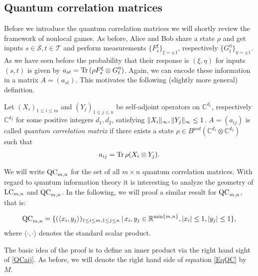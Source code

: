 \subsection{Quantum correlation matrices}
Before we introduce the quantum correlation matrices we will shortly review the framework of nonlocal games. As before, Alice and Bob share a state $ \rho $ and get inputs $ s \in \mathcal{S}, t \in \mathcal{T} $ and perform measurements $ \{ F_s^{\xi} \}_{\xi = \pm 1} $, respectively $ \{ G_t^{\eta} \}_{\eta = \pm 1} $.
As we have seen before the probability that their response is $ (\xi,\eta) $ for inputs $ (s,t) $ is given by 
$ a_{st} = \textup{Tr} \, {(\rho F_s^\xi \otimes G_t^\eta )}  $. Again, we can encode these information in a matrix $ A=(a_{st}) $. This motivates the following (slightly more general) definition. 
\begin{dfn}
	Let $ (X_i)_{1 \le i \le m } $ and $ (Y_j)_{1 \le j \le n} $ be self-adjoint operators on $ \mathbb{C}^{d_1} $, respectively $ \mathbb{C}^{d_2} $ for some positive integers $ d_1,d_2 $, satisfying $  \Vert {X_i} \Vert_{\infty},  \Vert {Y_j} \Vert_{\infty} \le 1 $. $ A = (a_{ij}) $ is called {\itshape quantum correlation matrix} if there exists a state $ \rho \in B^{psd}(\mathbb{C}^{d_1} \otimes \mathbb{C}^{d_2})$ such that 
	\begin{align}\label{QCaij}
	a_{ij} = \textup{Tr} \, {\rho (X_i \otimes Y_j)} .
	\end{align}
\end{dfn}
\noindent We will write $ \textup{QC}_{m,n} $ for the set of all $ m \times n $ quantum correlation matrices.
With regard to quantum information theory it is interesting to analyze the geometry of $ \textup{LC}_{m,n} $ and $ \textup{QC}_{m,n} $. In the following, we will proof a similar result for $ \textup{QC}_{m,n} $, that is: 
\begin{lemma}\label{LemQC}
	\begin{align}\label{EqQC}
		\textup{QC}_{m,n} = \{ (\langle x_i,y_j \rangle)_{1 \le i \le m, 1 \le j \le n} \,| \, x_i,y_j \in \mathbb{R}^{ \min \{m,n \} }, \vert x_i  \vert \le 1, \vert y_j \vert \le 1  \},
	\end{align}
	where $ \langle \cdot , \cdot \rangle $ denotes the standard scalar product. 
\end{lemma}
\noindent The basic idea of the proof is to define an inner product via the right hand sight of \ref{QCaij}.
As before, we will denote the right hand side of equation \ref{EqQC} by $ M $. 
